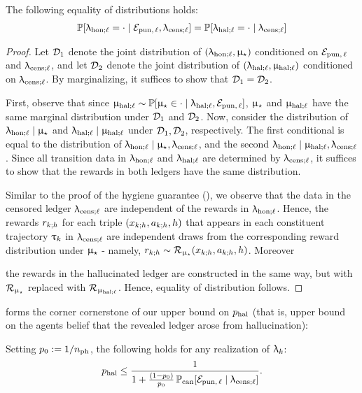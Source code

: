 \begin{claim}\label{claim:ledhonl_cannonical} The following equality of distributions holds:
\begin{align*}
\operatorname{\mathbb{P}}[\uplambda_{\mathrm{hon};\ell} = \cdot \mid \mathcal{E}_{\mathrm{pun},\,\ell}, \uplambda_{\mathrm{cens};\ell} ] = \operatorname{\mathbb{P}}[\uplambda_{\mathrm{hal};\ell} = \cdot \mid \uplambda_{\mathrm{cens};\ell} ]
\end{align*}
\end{claim}
\begin{proof}
Let $\mathcal{D}_{1}$ denote the joint distribution of $(\uplambda_{\mathrm{hon};\ell},\upmu_{\star})$ conditioned on $ \mathcal{E}_{\mathrm{pun},\,\ell} $ and $\uplambda_{\mathrm{cens};\ell}$, and let $\mathcal{D}_{2}$ denote the joint distribution of $(\uplambda_{\mathrm{hal};\ell},\upmu_{\mathrm{hal};\ell})$ conditioned on $\uplambda_{\mathrm{cens};\ell}$. By marginalizing, it suffices to show that $\mathcal{D}_{1} = \mathcal{D}_{2}$.

First, observe that since $\upmu_{\mathrm{hal};\ell} \sim \operatorname{\mathbb{P}}[ \upmu_{\star} \in \cdot \mid \uplambda_{\mathrm{hal};\ell},  \mathcal{E}_{\mathrm{pun},\,\ell}]$, $\upmu_{\star}$ and $\upmu_{\mathrm{hal};\ell}$ have the same marginal distribution under $\mathcal{D}_1$ and $\mathcal{D}_2$. Now, consider the distribution of $\uplambda_{\mathrm{hon};\ell} \mid \upmu_{\star}$ and $\uplambda_{\mathrm{hal};\ell} \mid \upmu_{\mathrm{hal};\ell} $ under $\mathcal{D}_1,\mathcal{D}_2$, respectively. The first conditional is equal to the distribution of $\uplambda_{\mathrm{hon};\ell} \mid \upmu_{\star}, \uplambda_{\mathrm{cens};\ell}$, and the second $\uplambda_{\mathrm{hon};\ell} \mid \upmu_{\mathrm{hal};\ell}, \uplambda_{\mathrm{cens};\ell}$. Since all transition data in $\uplambda_{\mathrm{hon};\ell}$ and $\uplambda_{\mathrm{hal};\ell}$ are determined by $\uplambda_{\mathrm{cens};\ell}$, it suffices to show that the rewards in both ledgers have the same distribution.

Similar to the proof of the hygiene guarantee (), we observe that the data in the censored ledger $\uplambda_{\mathrm{cens};\ell}$ are independent of the rewards in $\uplambda_{\mathrm{hon};\ell}$. Hence, the rewards $r_{k;h}$ for each triple $(x_{k;h},a_{k;h},h)$ that appears in each constituent trajectory ${\uptau}_k$ in $\uplambda_{\mathrm{cens};\ell}$ are independent draws from the corresponding reward distribution under $\upmu_{\star}$ - namely, $r_{k;h}\sim \mathcal{R}_{\upmu_{\star}}(x_{k;h},a_{k;h},h)$. Moreover \begin{comment}, recall from \Cref{eq:hallucinate_rewards}, that\end{comment} the rewards in the hallucinated ledger are constructed in the same way, but with $\mathcal{R}_{\upmu_{\star}}$ replaced with $\mathcal{R}_{\upmu_{\mathrm{hal};\ell}}$. Hence, equality of distribution follows.
\end{proof}
 forms the corner cornerstone of our upper bound on $p_{\mathrm{hal}}$ (that is, upper bound on the agents belief that the revealed ledger arose from hallucination):
\begin{claim}\label{claim:phal_claim} Setting  $p_0 := 1/n_{\mathrm{ph}}$, the following holds for any realization of $\uplambda_k$:
\begin{align*}
p_{\mathrm{hal}} \le \frac{1 }{1 + \frac{(1-p_0)}{p_0}\operatorname{\mathbb{P}}_{\mathrm{can}}[ \mathcal{E}_{\mathrm{pun},\,\ell} \mid \uplambda_{\mathrm{cens};\ell}] }.
\end{align*}
\end{claim}
